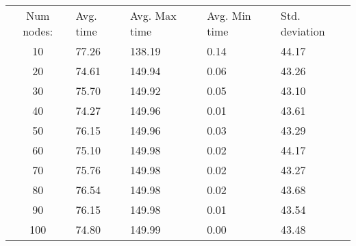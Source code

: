 \begin{tabular}{cllll}
Num nodes: & Avg. time & Avg. Max time & Avg. Min time & Std. deviation \\
10       & 77.26        & 138.19            & 0.14 & 44.17 \\
20       & 74.61        & 149.94            & 0.06 & 43.26 \\
30       & 75.70        & 149.92            & 0.05 & 43.10 \\
40       & 74.27        & 149.96            & 0.01 & 43.61 \\
50       & 76.15        & 149.96            & 0.03 & 43.29 \\
60       & 75.10        & 149.98            & 0.02 & 44.17 \\
70       & 75.76        & 149.98            & 0.02 & 43.27 \\
80       & 76.54        & 149.98            & 0.02 & 43.68 \\
90       & 76.15        & 149.98            & 0.01 & 43.54 \\
100       & 74.80        & 149.99            & 0.00 & 43.48 \\
\end{tabular}